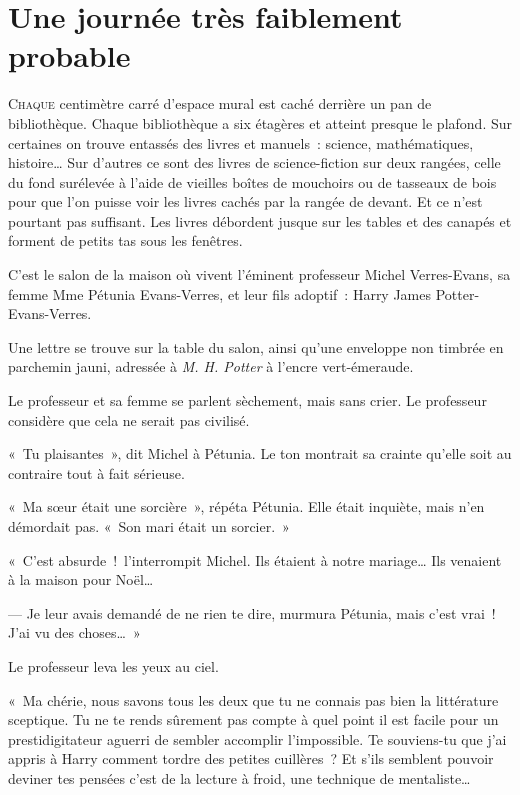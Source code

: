 \chapter{Une journée très faiblement probable}

\lettrine{C}{haque} centimètre carré d'espace mural est caché derrière un pan de bibliothèque. Chaque bibliothèque a six étagères et atteint presque le plafond. Sur certaines on trouve entassés des livres et manuels~: science, mathématiques, histoire… Sur d'autres ce sont des livres de science-fiction sur deux rangées, celle du fond surélevée à l'aide de vieilles boîtes de mouchoirs\footnotemark{} ou de tasseaux de bois pour que l'on puisse voir les livres cachés par la rangée de devant. Et ce n'est pourtant pas suffisant. Les livres débordent jusque sur les tables et des canapés et forment de petits tas sous les fenêtres.

C'est le salon de la maison où vivent l'éminent professeur Michel Verres-Evans, sa femme Mme Pétunia Evans-Verres, et leur fils adoptif~: Harry James Potter-Evans-Verres.

Une lettre se trouve sur la table du salon, ainsi qu'une enveloppe non timbrée en parchemin jauni, adressée à \emph{M. H. Potter} à l'encre vert-émeraude.

Le professeur et sa femme se parlent sèchement, mais sans crier. Le professeur considère que cela ne serait pas civilisé.

«~Tu plaisantes~», dit Michel à Pétunia. Le ton montrait sa crainte qu'elle soit au contraire tout à fait sérieuse.

«~Ma sœur était une sorcière~», répéta Pétunia. Elle était inquiète, mais n'en démordait pas. «~Son mari était un sorcier.~»

«~C'est absurde~!~l'interrompit Michel.  Ils étaient à notre mariage… Ils venaient à la maison pour Noël…

--- Je leur avais demandé de ne rien te dire, murmura Pétunia, mais c'est vrai~! J'ai vu des choses…~»

Le professeur leva les yeux au ciel.

«~Ma chérie, nous savons tous les deux que tu ne connais pas bien la littérature sceptique.  Tu ne te rends sûrement pas compte à quel point il est facile pour un prestidigitateur aguerri de sembler accomplir l'impossible. Te souviens-tu que j'ai appris à Harry comment tordre des petites cuillères~? Et s'ils semblent pouvoir deviner tes pensées c'est de la lecture à froid, une technique de mentaliste…


